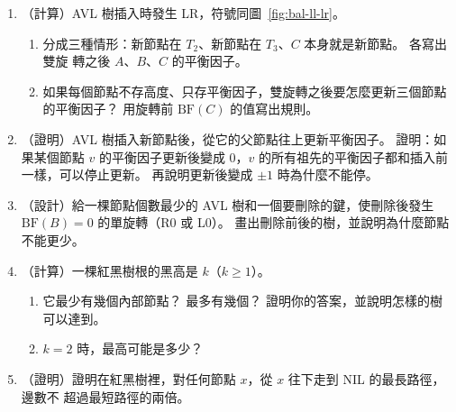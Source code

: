 \begin{enumerate}
\item （計算）AVL 樹插入時發生 LR，符號同圖~\ref{fig:bal-ll-lr}。
\begin{enumerate}
\item 分成三種情形：新節點在 $T_2$、新節點在 $T_3$、$C$ 本身就是新節點。 各寫出雙旋
轉之後 $A$、$B$、$C$ 的平衡因子。
\item 如果每個節點不存高度、只存平衡因子，雙旋轉之後要怎麼更新三個節點的平衡因子？
用旋轉前 $\mathrm{BF}(C)$ 的值寫出規則。
\end{enumerate}

\item （證明）AVL 樹插入新節點後，從它的父節點往上更新平衡因子。 證明：如果某個節點
$v$ 的平衡因子更新後變成 $0$，$v$ 的所有祖先的平衡因子都和插入前一樣，可以停止更新。
再說明更新後變成 $\pm 1$ 時為什麼不能停。

\item （設計）給一棵節點個數最少的 AVL 樹和一個要刪除的鍵，使刪除後發生
$\mathrm{BF}(B) = 0$ 的單旋轉（R0 或 L0）。 畫出刪除前後的樹，並說明為什麼節點不能更少。

\item （計算）一棵紅黑樹根的黑高是 $k$（$k \ge 1$）。
\begin{enumerate}
\item 它最少有幾個內部節點？ 最多有幾個？ 證明你的答案，並說明怎樣的樹可以達到。
\item $k = 2$ 時，最高可能是多少？
\end{enumerate}

\item （證明）證明在紅黑樹裡，對任何節點 $x$，從 $x$ 往下走到 NIL 的最長路徑，邊數不
超過最短路徑的兩倍。


\end{enumerate}
